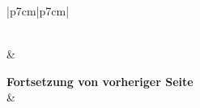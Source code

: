 \documentclass[fontsize=14pt]{../../inc/mybib}
\begin{document}
\begin{longtable}{|p{7cm}|p{7cm}|}
    \caption{Biblische Argumente – Pro und Kontra Israel-Ersatz} \\
    \hline
     & 
     \\
    \hline
    \endfirsthead

    {{\bfseries Fortsetzung von vorheriger Seite}} \\
    \hline
     & 
     \\
    \hline
    \endhead

    \hline {} \\
    \endfoot

    \hline
    \endlastfoot


\end{longtable}
\end{document}
